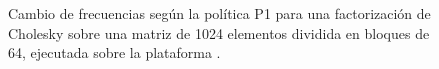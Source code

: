 \begin{figure}
  \centering
  \caption[Cambio de frecuencias según la política P1]{Cambio de
    frecuencias según la política P1 para una factorización de Cholesky
    sobre una matriz de 1024 elementos dividida en bloques de 64, ejecutada
    sobre la plataforma \juno.}
  \label{s5:fig:P1-evo}
\end{figure}

